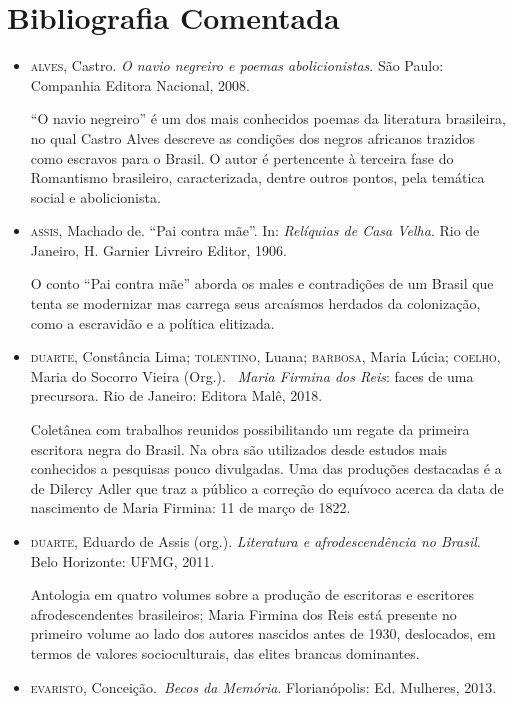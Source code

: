 \documentclass[12pt]{extarticle}
\begin{document}
\section{Bibliografia Comentada}

\begin{itemize}
\item\textsc{alves}, Castro. \textit{O navio negreiro e poemas abolicionistas}. São
  Paulo: Companhia Editora Nacional, 2008.

``O navio negreiro'' é um dos mais conhecidos poemas da literatura brasileira, 
no qual Castro Alves descreve as condições dos negros africanos 
trazidos como escravos para o Brasil. O autor é pertencente à terceira 
fase do Romantismo brasileiro, caracterizada, dentre outros pontos, 
pela temática social e abolicionista.

\item\textsc{assis}, Machado de. ``Pai contra mãe''. In: \textit{Relíquias de Casa
  Velha}. Rio de Janeiro, H. Garnier Livreiro Editor, 1906.

O conto ``Pai contra mãe'' aborda os males e contradições de um Brasil que tenta se modernizar
mas carrega seus arcaísmos herdados da colonização, como a escravidão e
a política elitizada.

\item\textsc{duarte}, Constância Lima; \textsc{tolentino}, Luana; \textsc{barbosa}, 
Maria Lúcia; \textsc{coelho}, Maria do Socorro Vieira (Org.).
\emph{~Maria Firmina dos Reis}: faces de
uma precursora. Rio de Janeiro: Editora Malê, 2018. 

Coletânea com
trabalhos reunidos possibilitando um regate da primeira escritora negra
do Brasil. Na obra são utilizados desde estudos mais conhecidos a
pesquisas pouco divulgadas. Uma das produções destacadas é a de Dilercy
Adler que traz a público a correção do equívoco acerca da data de
nascimento de Maria Firmina: 11 de março de 1822.

\item\textsc{duarte}, Eduardo de Assis (org.). 
\emph{Literatura e afrodescendência no Brasil}. Belo Horizonte: UFMG, 2011. 

Antologia em quatro volumes sobre a
produção de escritoras e escritores afrodescendentes brasileiros; Maria
Firmina dos Reis está presente no primeiro volume ao lado dos autores
nascidos antes de 1930, deslocados, em termos de valores socioculturais,
das elites brancas dominantes.

\item\textsc{evaristo}, Conceição.~\textit{Becos da Memória}. Florianópolis: Ed.
  Mulheres, 2013.


\end{itemize}
\end{document}
